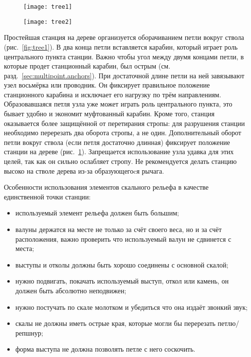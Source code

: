 \documentclass[fleqn, 12pt]{extarticle}
\begin{document}
    \begin{figure}
        \centering
        \begin{minipage}[t]{0.45\textwidth}
            \texttt{[image: tree1]}
            \label{fig:tree1}
        \end{minipage}\hspace{0.05\textwidth}
        \begin{minipage}[t]{0.45\textwidth}
            \texttt{[image: tree2]}
            \label{fig:tree2}
        \end{minipage}
    \end{figure}

	Простейшая станция на дереве организуется оборачиванием петли вокруг ствола (рис.~\ref{fig:tree1}). В два конца петли вставляется карабин, который играет роль центрального пункта станции.
    Важно чтобы угол между двумя концами петли, в которые продет станционный карабин, был острым
    (см. разд.~\ref{sec:multipoint.anchors}). При достаточной длине петли на ней завязывают узел восьмёрка или проводник. Он фиксирует правильное положение станционного карабина
    и исключает его нагрузку по трём направлениям. Образовавшаяся петля узла уже может играть 
    роль центрального пункта, это бывает удобно и экономит муфтованный карабин. Кроме того, станция оказывается более защищённой от перетирания стропы: для разрушения станции необходимо
    перерезать два оборота стропы, а не один. Дополнительный оборот петли вокруг ствола (если петля достаточно длинная)
    фиксирует положение станции на дереве (рис.~\ref{fig:tree2}).
    Запрещается использование узла удавка для этих целей, так как он сильно ослабляет стропу.
    Не рекомендуется делать станцию высоко на стволе дерева из-за образующегоcя рычага.

    Особенности использования элементов скального рельефа в качестве единственной точки станции:
    \begin{itemize}
        \item используемый элемент рельефа должен быть большим;
        \item валуны держатся на месте не только за счёт своего веса, но и за счёт расположения, важно проверить что используемый валун не сдвинется с места;
        \item выступы и отколы должны быть хорошо соединены с основной скалой;
        \item нужно подвигать, покачать используемый выступ, откол или камень, он должен быть абсолютно неподвижен;
        \item нужно постучать по скале молотком и убедиться что она издаёт звонкий звук;
        \item скалы не должны иметь острые края, которые могли бы перерезать петлю/репшнур;
        \item форма выступа не должна позволять петле с него соскочить.
    \end{itemize}
    
\end{document}
